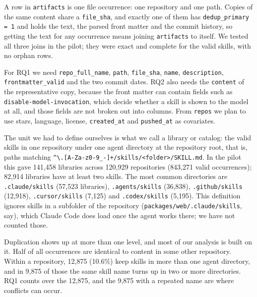 \documentclass[11pt]{article}
\begin{document}
A row in \texttt{artifacts} is one file occurrence: one repository and one path. Copies of the same content share a
\texttt{file\_sha}, and exactly one of them has \texttt{dedup\_primary = 1} and holds the text, the parsed front matter and the
commit history, so getting the text for any occurrence means joining \texttt{artifacts} to itself. We tested all three joins
in the pilot; they were exact and complete for the valid skills, with no orphan rows.

For RQ1 we need \texttt{repo\_full\_name}, \texttt{path}, \texttt{file\_sha}, \texttt{name}, \texttt{description},
\texttt{frontmatter\_valid} and the two commit dates. RQ2 also needs the \texttt{content} of the representative copy, because
the front matter can contain fields such as \texttt{disable-model-invocation}, which decide whether a skill is shown to the
model at all, and those fields are not broken out into columns. From \texttt{repos} we plan to use stars, language, license,
\texttt{created\_at} and \texttt{pushed\_at} as covariates.

The unit we had to define ourselves is what we call a library or catalog: the valid skills in one repository under one agent
directory at the repository root, that is, paths matching
\texttt{\^{}\textbackslash.[A-Za-z0-9\_-]+/skills/<folder>/SKILL.md}. In the pilot this gave 141{,}458 libraries across
120{,}929 repositories (843{,}271 valid occurrences); 82{,}914 libraries have at least two skills. The most common
directories are \texttt{.claude/skills} (57{,}523 libraries), \texttt{.agents/skills} (36{,}838), \texttt{.github/skills}
(12{,}918), \texttt{.cursor/skills} (7{,}125) and \texttt{.codex/skills} (5{,}195). This definition ignores skills in a
subfolder of the repository (\texttt{packages/web/.claude/skills}, say), which Claude Code does load once the agent works
there; we have not counted those.

Duplication shows up at more than one level, and most of our analysis is built on it. Half of all occurrences are identical
to content in some other repository. Within a repository, 12{,}875 (10.6\%) keep skills in more than one agent directory,
and in 9{,}875 of those the same skill name turns up in two or more directories. RQ1 counts over the 12{,}875, and the
9{,}875 with a repeated name are where conflicts can occur.
\end{document}
